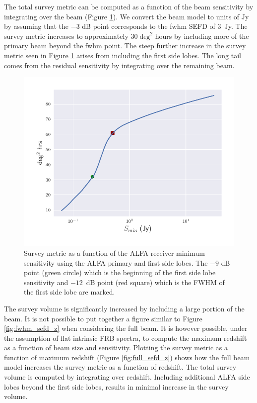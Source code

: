 \documentclass[a4paper,fleqn,usenatbib]{mnras}
\begin{document}
The total survey metric can be computed as a function of the beam sensitivity by
integrating over the beam (Figure \ref{fig:survey_metric_sense}). We convert the
beam model to units of Jy by assuming that the $-3$ dB point corresponds to the
\gls{fwhm} SEFD of 3~Jy. The survey metric increases to approximately $30 \;
\textrm{deg}^2$ hours by including more of the primary beam beyond the
\gls{fwhm} point. The steep further increase in the survey metric seen in Figure
\ref{fig:survey_metric_sense} arises from including the first side lobes. The
long tail comes from the residual sensitivity by integrating over the remaining
beam.

\begin{figure}
    \includegraphics[width=1.0\linewidth]{figures/full_survey_metric_sense.pdf}
    \caption{Survey metric as a function of the ALFA receiver minimum
    sensitivity using the ALFA primary and first side lobes. The $-9$ dB point
    (green circle) which is the beginning of the first side lobe sensitivity and
    $-12$~dB point (red square) which is the FWHM of the first side lobe are
    marked.
    }
    \label{fig:survey_metric_sense}
\end{figure}

The survey volume is significantly increased by including a large portion of the
beam. It is not possible to put together a figure similar to Figure
\ref{fig:fwhm_sefd_z} when considering the full beam. It is however possible,
under the assumption of flat intrinsic FRB spectra, to compute the maximum
redshift as a function of beam size and sensitivity. Plotting the survey metric
as a function of maximum redshift (Figure \ref{fig:full_sefd_z}) shows how the
full beam model increases the survey metric as a function of redshift. The total
survey volume is computed by integrating over redshift.  Including additional
ALFA side lobes beyond the first side lobes, results in minimal increase in the survey volume.
\end{document}
